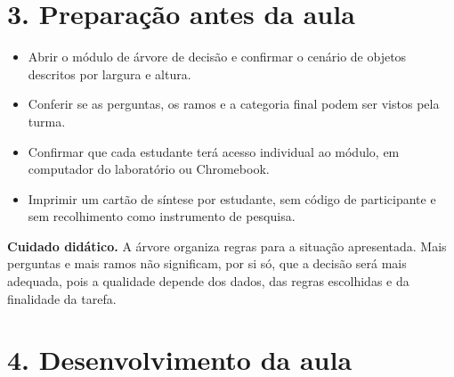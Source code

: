 \documentclass[12pt,a4paper]{article}
\newcommand{\bloco}[1]{%
  \vspace{0.25em}
  \noindent\colorbox{cinza}{\parbox{0.96\linewidth}{#1}}%
  \vspace{0.3em}
}
\begin{document}
\section*{3. Preparação antes da aula}

\begin{itemize}
  \item Abrir o módulo de árvore de decisão e confirmar o cenário de objetos descritos por largura e altura.
  \item Conferir se as perguntas, os ramos e a categoria final podem ser vistos pela turma.
  \item Confirmar que cada estudante terá acesso individual ao módulo, em computador do laboratório ou Chromebook.
  \item Imprimir um cartão de síntese por estudante, sem código de participante e sem recolhimento como instrumento de pesquisa.
\end{itemize}

\bloco{\textbf{Cuidado didático.} A árvore organiza regras para a situação apresentada. Mais perguntas e mais ramos não significam, por si só, que a decisão será mais adequada, pois a qualidade depende dos dados, das regras escolhidas e da finalidade da tarefa.}

\section*{4. Desenvolvimento da aula}
\end{document}
